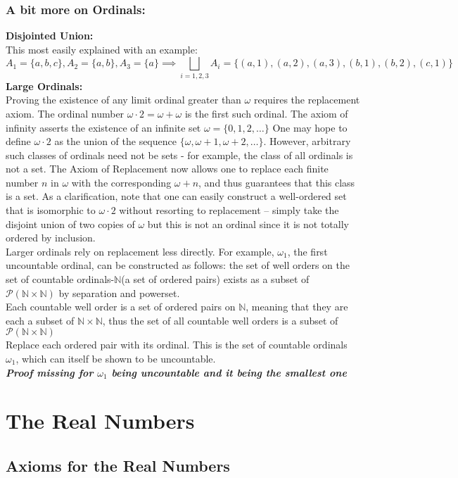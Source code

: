 \documentclass{article}
\newcommand{\0}{{\bf{0}}}
\begin{document}
\subsubsection{A bit more on Ordinals:}
\textbf{Disjointed Union:}\\
This most easily explained with an example:
$$A_1=\{a,b,c\},A_2=\{a,b\},A_3=\{a\}\implies\bigsqcup_{i=1,2,3}A_i=\{(a,1),(a,2),(a,3),(b,1),(b,2),(c,1)\}$$
\textbf{Large Ordinals:}\\
Proving the existence of any limit ordinal greater than $\omega$ requires the replacement axiom. The ordinal number $\omega\cdot2=\omega+\omega$ is the first such ordinal. The axiom of infinity asserts the existence of an infinite set $\omega=\{0,1,2,\dots\}$ One may hope to define $\omega\cdot2$ as the union of the sequence $\{\omega,\omega+1,\omega+2,\dots\}$. However, arbitrary such classes of ordinals need not be sets - for example, the class of all ordinals is not a set. The Axiom of Replacement now allows one to replace each finite number $n$ in $\omega$ with the corresponding $\omega+n$, and thus guarantees that this class is a set. As a clarification, note that one can easily construct a well-ordered set that is isomorphic to $\omega\cdot2$ without resorting to replacement – simply take the disjoint union of two copies of $\omega$ but this is not an ordinal since it is not totally ordered by inclusion.\\
Larger ordinals rely on replacement less directly. For example, $\omega_1$, the first uncountable ordinal, can be constructed as follows: the set of well orders on the set of countable ordinals-$\mathbb{N}$(a set of ordered pairs) exists as a subset of $\mathcal{P}(\mathbb{N}\times\mathbb{N})$ by separation and powerset.\\
Each countable well order is a set of ordered pairs on $\mathbb{N}$, meaning that they are each a subset of $\mathbb{N}\times\mathbb{N}$, thus the set of all countable well orders is a subset of $\mathcal{P}(\mathbb{N}\times\mathbb{N})$\\
Replace each ordered pair with its ordinal. This is the set of countable ordinals $\omega_1$, which can itself be shown to be uncountable.\\
\null\hfill{\textit{\textbf{Proof missing for $\omega_1$ being uncountable and it being the smallest one}}}
\section{The Real Numbers}
\subsection{Axioms for the Real Numbers}
\end{document}
